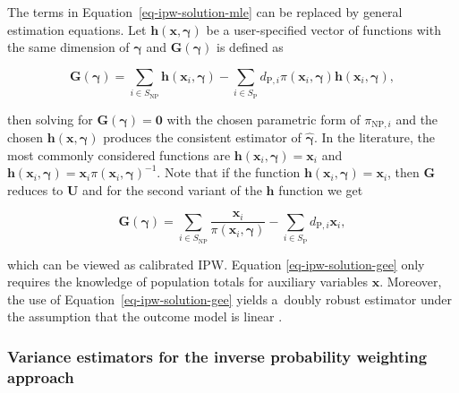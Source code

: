 \documentclass[
]{jss}
\begin{document}
The terms in Equation~\ref{eq-ipw-solution-mle} can be replaced by
general estimation equations. Let
\(\boldsymbol{h}(\boldsymbol{x}, \boldsymbol{\gamma})\) be a
user-specified vector of functions with the same dimension of
\(\boldsymbol{\gamma}\) and \(\boldsymbol{G}(\boldsymbol{\gamma})\) is
defined as

\begin{equation}
\label{gee}
\boldsymbol{G}(\boldsymbol{\gamma})=\sum_{i \in S_{\text{NP}}} \boldsymbol{h}\left(\boldsymbol{x}_i, \boldsymbol{\gamma}\right)-\sum_{i \in S_{\text{P}}} d_{\text{P},i} \pi\left(\boldsymbol{x}_i, \boldsymbol{\gamma}\right) \boldsymbol{h}\left(\boldsymbol{x}_i, \boldsymbol{\gamma}\right),
\end{equation}

then solving for \(\boldsymbol{G}(\boldsymbol{\gamma})=\boldsymbol{0}\)
with the chosen parametric form of \(\pi_{\text{NP},i}\) and the chosen
\(\boldsymbol{h}(\boldsymbol{x},\boldsymbol{\gamma})\) produces the
consistent estimator of \(\hat{\boldsymbol{\gamma}}\). In the
literature, the most commonly considered functions are
\(\boldsymbol{h}\left(\boldsymbol{x}_i, \boldsymbol{\gamma}\right) = \boldsymbol{x}_i\)
and
\(\boldsymbol{h}\left(\boldsymbol{x}_i, \boldsymbol{\gamma}\right) = \boldsymbol{x}_i \pi\left(\boldsymbol{x}_i, \boldsymbol{\gamma}\right)^{-1}\).
Note that if the function
\(\boldsymbol{h}\left(\boldsymbol{x}_i, \boldsymbol{\gamma}\right)=\boldsymbol{x}_i\),
then \(\boldsymbol{G}\) reduces to \(\boldsymbol{U}\) and for the second
variant of the \(\boldsymbol{h}\) function we get

\begin{equation}
\boldsymbol{G}(\boldsymbol{\gamma}) = \sum_{i \in S_{\text{NP}}} \frac{\boldsymbol{x}_i}{\pi\left(\boldsymbol{x}_i, \boldsymbol{\gamma}\right) }-\sum_{i \in S_{\text{P}}} d_{\text{P},i} \boldsymbol{x}_{i},
\label{eq-ipw-solution-gee}
\end{equation}

which can be viewed as calibrated IPW. Equation
\ref{eq-ipw-solution-gee} only requires the knowledge of population
totals for auxiliary variables \(\boldsymbol{x}\). Moreover, the use of
Equation~\ref{eq-ipw-solution-gee} yields a~doubly robust estimator
under the assumption that the outcome model is linear
\citep[cf.][]{kim_theory_2012}.

\subsubsection{Variance estimators for the inverse probability weighting
approach}\label{variance-estimators-for-the-inverse-probability-weighting-approach}
\end{document}

